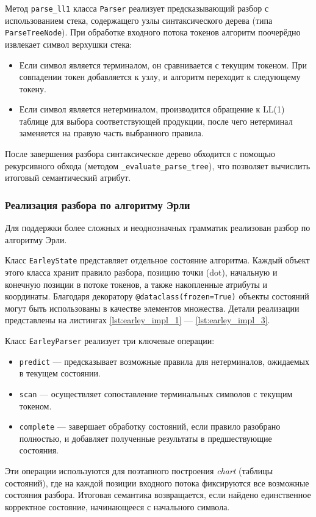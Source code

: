 \documentclass[14pt, russian]{scrartcl}
\begin{document}
Метод \texttt{parse\_ll1} класса \texttt{Parser} реализует предсказывающий разбор с использованием стека,
содержащего узлы синтаксического дерева (типа \texttt{ParseTreeNode}). При обработке входного потока токенов
алгоритм поочерёдно извлекает символ верхушки стека:
\begin{itemize}
	\item Если символ является терминалом, он сравнивается с текущим токеном. При совпадении токен добавляется
	к узлу, и алгоритм переходит к следующему токену.
	\item Если символ является нетерминалом, производится обращение к LL(1) таблице для выбора соответствующей
	продукции, после чего нетерминал заменяется на правую часть выбранного правила.
\end{itemize}
После завершения разбора синтаксическое дерево обходится с помощью рекурсивного обхода
(методом \texttt{\_evaluate\_parse\_tree}), что позволяет вычислить итоговый семантический атрибут.

\subsubsection{Реализация разбора по алгоритму Эрли}

Для поддержки более сложных и неоднозначных грамматик реализован разбор по алгоритму Эрли.

Класс \texttt{EarleyState} представляет отдельное состояние алгоритма. Каждый объект этого класса хранит
правило разбора, позицию точки (dot), начальную и конечную позиции в потоке токенов, а также
накопленные атрибуты и координаты. Благодаря декоратору \texttt{@dataclass(frozen=True)} объекты состояний
могут быть использованы в качестве элементов множества. Детали реализации представлены на листингах
\ref{lst:earley_impl_1} --- \ref{lst:earley_impl_3}.

Класс \texttt{EarleyParser} реализует три ключевые операции:
\begin{itemize}
	\item \texttt{predict} --- предсказывает возможные правила для нетерминалов, ожидаемых в текущем состоянии.
	\item \texttt{scan} --- осуществляет сопоставление терминальных символов с текущим токеном.
	\item \texttt{complete} --- завершает обработку состояний, если правило разобрано
	полностью, и добавляет полученные результаты в предшествующие состояния.
\end{itemize}
Эти операции используются для поэтапного построения \emph{chart} (таблицы состояний), где на
каждой позиции входного потока фиксируются все возможные состояния разбора. Итоговая семантика
возвращается, если найдено единственное корректное состояние, начинающееся с начального символа.
\end{document}
